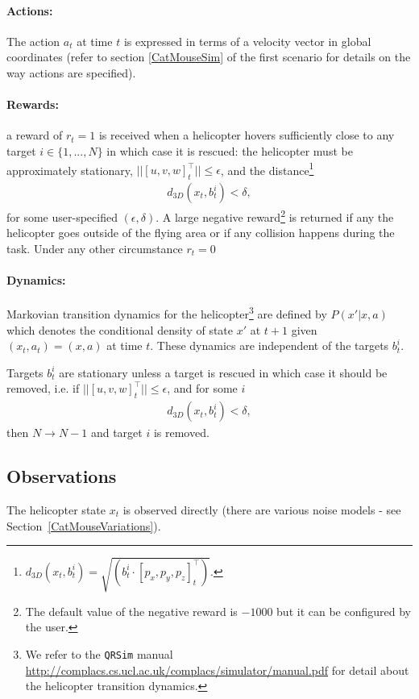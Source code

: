 \documentclass{article}
\newcommand{\webman}{\url{http://complacs.cs.ucl.ac.uk/complacs/simulator/manual.pdf}\xspace}
\newcommand{\nn}{\nonumber}
\begin{document}
\paragraph{Actions:}
The action $a_t$ at time $t$ is expressed in terms of a velocity vector in global coordinates (refer to section \ref{CatMouseSim} of the first scenario for details on the way actions are specified).

\paragraph{Rewards:} a reward of $r_t=1$ is received when a helicopter hovers sufficiently close to any target $i\in\{1,...,N\}$ in which case it is rescued: the helicopter must be approximately stationary, $||[u,v,w]_t^\intercal|| \le \epsilon$, and the distance\footnote{$d_{3D}(x_t,b^i_t) = \sqrt{(b^i_t\cdot[p_x,p_y,p_z]_t^\intercal)}$.}
\begin{align}
d_{3D}(x_t,b^i_t)<\delta, \nn
\end{align}
for some user-specified $(\epsilon,\delta)$. 
A large negative reward\footnote{The default value of the negative reward is $-1000$ but it can be configured by the user.} is returned if any the helicopter goes outside of the flying area or if any collision happens during the task. Under any other circumstance $r_t=0$

\paragraph{Dynamics:} Markovian transition dynamics for the helicopter\footnote{We refer to the \texttt{QRSim} manual \webman for detail about the helicopter transition dynamics.} are defined by $P(x'|x,a)$ which denotes the conditional density of state $x'$ at $t+1$ given $(x_t,a_t) = (x,a)$ at time $t$. These dynamics are independent of the targets $b^i_t$.

Targets $b^i_t$ are stationary unless a target is rescued in which case it should be removed, i.e. if $||[u,v,w]_t^\intercal|| \le \epsilon$, and for some $i$
\begin{align}
d_{3D}(x_t,b^i_t)<\delta, \nn
\end{align}
then $N\rightarrow N-1$ and target $i$ is removed.

\subsection{Observations}

The helicopter state $x_t$ is observed directly (there are various noise models - see Section~\ref{CatMouseVariations}).
\end{document}
